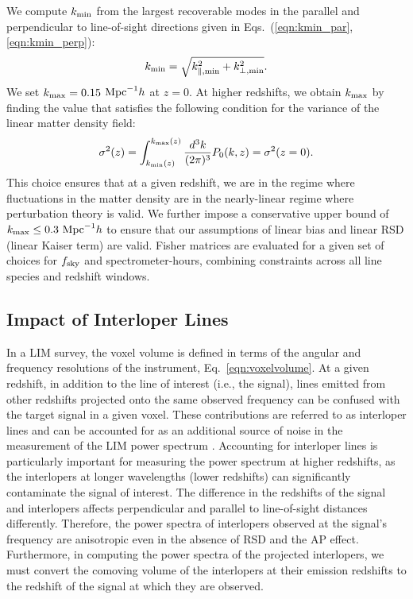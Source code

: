 \documentclass[twocolumn]{aastex631}
\newcommand{\be}{\begin{equation}}
\newcommand{\ee}{\end{equation}}
\begin{document}
We compute $k_{\rm min}$ from the largest recoverable modes in the parallel and perpendicular to line-of-sight directions given in Eqs.~(\ref{eqn:kmin_par}, \ref{eqn:kmin_perp}):
\be
k_{\rm min} = \sqrt{k_{\parallel, {\rm min}}^2 + k_{\perp, {\rm min}}^2}.
\ee
We set $k_{\rm max} = 0.15$ ${\rm Mpc}^{-1}h$ at $z=0$. At higher redshifts, we obtain $k_{\rm max}$ by finding the value that satisfies the following condition for the variance of the linear matter density field:
\be
\sigma^2(z) = \int_{k_{\rm min}(z)}^{k_{\rm max}(z)} \frac{d^3 k}{(2\pi)^3} P_0(k,z) = \sigma^2(z=0).
\ee 
This choice ensures that at a given redshift, we are in the regime where fluctuations in the matter density are in the nearly-linear regime where perturbation theory is valid. We further impose a conservative upper bound of $k_{\rm max} \leq 0.3 \ {\rm Mpc}^{-1}h$ to ensure that our assumptions of linear bias and linear RSD (linear Kaiser term) are valid.   
Fisher matrices are evaluated for a given set of choices for $f_{\rm sky}$ and spectrometer-hours, combining constraints across all line species and redshift windows.

\subsection{Impact of Interloper Lines}

In a LIM survey, the voxel volume is defined in terms of the angular and frequency resolutions of the instrument, Eq.~\eqref{eqn:voxelvolume}. At a given redshift, in addition to the line of interest (i.e., the signal), lines emitted from other redshifts projected onto the same observed frequency can be confused with the target signal in a given voxel. These contributions are referred to as interloper lines and can be accounted for as an additional source of noise in the measurement of the LIM power spectrum \citep{Cheng:2016, Gong:2020lim}. Accounting for interloper lines is particularly important for measuring the power spectrum at higher redshifts, as the interlopers at longer wavelengths (lower redshifts) can significantly contaminate the signal of interest. The difference in the redshifts of the signal and interlopers affects perpendicular and parallel to line-of-sight distances differently. Therefore, the power spectra of interlopers observed at the signal's frequency are anisotropic even in the absence of RSD and the AP effect. Furthermore, in computing the power spectra of the projected interlopers, we must convert the comoving volume of the interlopers at their emission redshifts to the redshift of the signal at which they are observed. 
\end{document}
